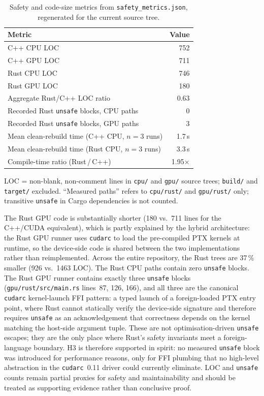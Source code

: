 \documentclass{article}
\begin{document}
\begin{table}[htbp]
\caption{Safety and code-size metrics from
         \texttt{safety\_metrics.json}, regenerated for the
         current source tree.}
\label{tab:safety}
\centering
\begin{tabular}{lr}
\toprule
Metric & Value \\
\midrule
C++ CPU LOC                                              & 752  \\
C++ GPU LOC                                              & 711  \\
Rust CPU LOC                                             & 746  \\
Rust GPU LOC                                             & 180  \\
Aggregate Rust/C++ LOC ratio                             & 0.63 \\
Recorded Rust \texttt{unsafe} blocks, CPU paths          & 0    \\
Recorded Rust \texttt{unsafe} blocks, GPU paths          & 3    \\
Mean clean-rebuild time (C++ CPU, $n=3$ runs)            & 1.7\,s \\
Mean clean-rebuild time (Rust CPU, $n=3$ runs)           & 3.3\,s \\
Compile-time ratio (Rust\,/\,C++)                        & 1.95$\times$ \\
\bottomrule
\end{tabular}
{\small LOC = non-blank, non-comment lines in \texttt{cpu/} and
 \texttt{gpu/} source trees; \texttt{build/} and \texttt{target/}
 excluded.
 ``Measured paths'' refers to \texttt{cpu/rust/} and
 \texttt{gpu/rust/} only; transitive \texttt{unsafe} in
 Cargo dependencies is not counted.}
\end{table}

The Rust GPU code is substantially shorter (180 vs.\ 711 lines for the
C++/CUDA equivalent), which is partly explained by the hybrid
architecture: the Rust GPU runner uses \texttt{cudarc} to load the
pre-compiled PTX kernels at runtime, so the device-side code is shared
between the two implementations rather than reimplemented.
Across the entire repository, the Rust trees are 37\,\% smaller
(926 vs.\ 1463 LOC).
The Rust CPU paths contain zero \texttt{unsafe} blocks.
The Rust GPU runner contains exactly three \texttt{unsafe} blocks
(\texttt{gpu/rust/src/main.rs} lines~87, 126, 166), and all three are
the canonical \texttt{cudarc} kernel-launch FFI pattern: a typed launch of
a foreign-loaded PTX entry point, where Rust cannot statically verify the
device-side signature and therefore requires \texttt{unsafe} as an
acknowledgement that correctness depends on the kernel matching the
host-side argument tuple.
These are not optimisation-driven \texttt{unsafe} escapes; they are
the only place where Rust's safety invariants meet a foreign-language
boundary.
H3 is therefore supported in spirit: no measured \texttt{unsafe} block was
introduced for performance reasons, only for FFI plumbing that no
high-level abstraction in the \texttt{cudarc}~0.11 driver could
currently eliminate.
LOC and \texttt{unsafe} counts remain partial proxies for safety and
maintainability and should be treated as supporting evidence rather
than conclusive proof.
\end{document}
